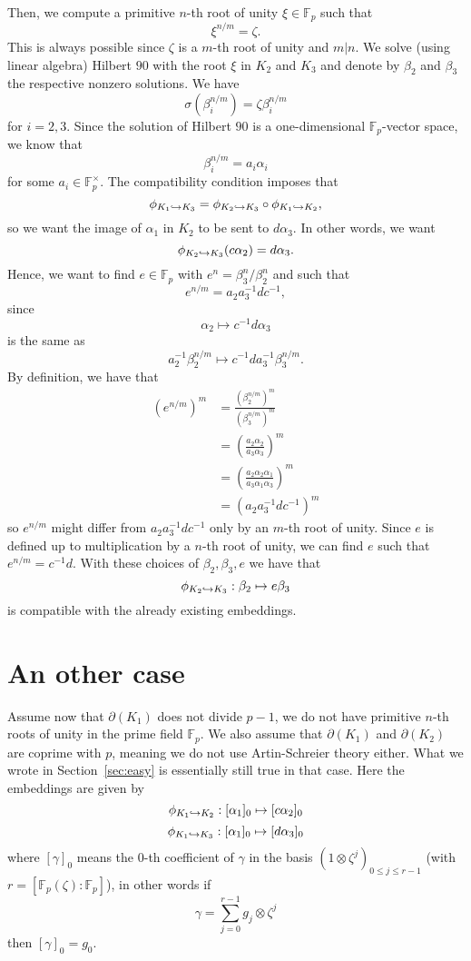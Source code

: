 \documentclass[a4paper,11pt]{article}
\begin{document}
Then, we compute a primitive $n$-th root of unity $\xi\in\mathbb{F}_p$ such that
\[
  \xi^{n/m}=\zeta.
\]
This is always possible since $\zeta$ is a $m$-th root of unity and $m|n$.
We solve (using linear algebra) Hilbert $90$ with the root
$\xi$ in $K_2$ and $K_3$ and denote by $\beta_2$ and $\beta_3$ the respective
nonzero solutions. We have
\[
  \sigma(\beta_i^{n/m})=\zeta\beta_i^{n/m}
\] for $i=2,3$. Since the solution of Hilbert $90$ is a one-dimensional
$\mathbb{F}_p$-vector space, we know that
\[
  \beta_i^{n/m}=a_i\alpha_i
\] for some $a_i\in\mathbb{F}_p^\times$. The compatibility condition imposes that 
\[
  \phi_{K_1\hookrightarrow K_3}=\phi_{K_2\hookrightarrow K_3}\circ\phi_{K_1\hookrightarrow K_2},
\]
so we want the image of $\alpha_1$ in $K_2$ to be sent to $d\alpha_3$. In other
words, we want
\[
  \phi_{K_2\hookrightarrow K_3}(c\alpha_2) = d\alpha_3.
\]
Hence, we want to find $e\in\mathbb{F}_p$ with $e^n=\beta_3^n/\beta_2^n$
and such that
\[
  e^{n/m}=a_2a_3^{-1}dc^{-1},
\]
since 
\[
  \alpha_2\mapsto c^{-1}d\alpha_3
\]
is the same as
\[
  a_2^{-1}\beta_2^{n/m}\mapsto c^{-1}da_3^{-1}\beta_3^{n/m}.
\]
By definition, we have that 
\begin{align*}
  (e^{n/m})^m &= \frac{(\beta_2^{n/m})^m}{(\beta_3^{n/m})^m}\\
  &= \left(\frac{a_2\alpha_2}{a_3\alpha_3}\right)^m\\
  &= \left(\frac{a_2\alpha_2\alpha_1}{a_3\alpha_1\alpha_3}\right)^m\\
  &= \left( a_2a_3^{-1}dc^{-1} \right)^m
\end{align*}
so $e^{n/m}$ might differ from $a_2a_3^{-1}dc^{-1}$ only by an $m$-th root of unity. Since $e$ is defined
up to multiplication by a $n$-th root of unity, we can find $e$ such that
$e^{n/m}=c^{-1}d$. With these choices of $\beta_2, \beta_3, e$ we have that 
\[
  \phi_{K_2\hookrightarrow K_3}:\beta_2\mapsto e\beta_3
\]
is compatible with the already existing embeddings.
\section{An other case}
Assume now that $\partial(K_1)$ does not divide $p-1$, \ie we do not have
primitive $n$-th roots of unity in the prime field $\mathbb{F}_p$. We also
assume that $\partial(K_1)$ and $\partial(K_2)$ are coprime with $p$, meaning we
do not use Artin-Schreier theory either. What we wrote in
Section~\ref{sec:easy} is essentially still true in that case. Here the
embeddings are given by
\[
  \phi_{K_1\hookrightarrow K_2}:[\alpha_1]_0\mapsto[c\alpha_2]_0
\]
\[
  \phi_{K_1\hookrightarrow K_3}:[\alpha_1]_0\mapsto[d\alpha_3]_0
\]
where $[\gamma]_0$ means the $0$-th coefficient of $\gamma$ in the basis
$(1\otimes\zeta^j)_{0\leq j\leq r-1}$ (with
$r=[\mathbb{F}_p(\zeta):\mathbb{F}_p]$), in other words if 
\[
  \gamma=\sum_{j=0}^{r-1}g_j\otimes\zeta^j
\]
then $[\gamma]_0=g_0$.
\end{document}
